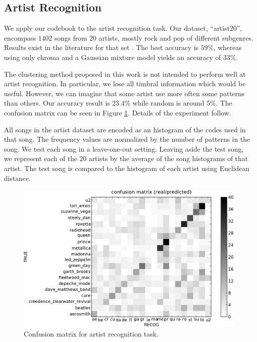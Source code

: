 \documentclass{article}
\begin{document}
\subsection{Artist Recognition} \label{ssec:artist}

We apply our codebook to the artist recognition task.
Our dataset, ``artist20'', encompass $1402$ songs from $20$ artists, 
mostly rock and pop of different subgenres. Results exist in the
literature for that set \cite{Ellis2007}. The best accuracy is
$59\%$, whereas using only chroma and a Gaussian mixture model
yields an accuracy of $33\%$.

The clustering method proposed in this work is not
intended to perform well at artist recognition. 
In particular,
we lose all timbral information which would be useful. 
However, we can
imagine that some artist use more often some patterns than others.
Our accuracy result is $23.4\%$ while random
is around $5\%$. 
The confusion matrix can be seen in Figure \ref{fig:conf_mat}.
Details of the experiment follow.

All songs in the artist dataset are encoded as an histogram of the codes
used in that song. The frequency values are normalized by the number
of patterns in the song. We test each song in a leave-one-out setting.
Leaving aside the test song, we represent each of the $20$ artists by the 
average of
the song histograms of that artist. The test song is compared to
the histogram of each artist using Euclidean distance.


\begin{figure}[htb]
\includegraphics[width=.9\columnwidth]{conf_mat_per_artist}
\caption{\small{Confusion matrix for artist recognition task.}}
\label{fig:conf_mat}
\end{figure}
\end{document}
